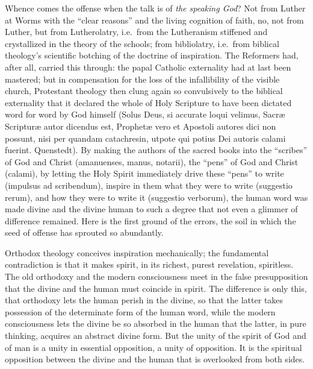 \documentclass[12pt]{book}
\newcommand{\opage}[1]{\marginnote{\footnotesize\textit{[#1]}}}
\begin{document}
Whence comes the offense when the talk is of \emph{the speaking God}? Not
from Luther at Worms with the ``clear reasons'' and the living cognition
of faith, no, not from Luther, but from Lutherolatry, i.e.\ from the
Lutheranism stiffened and crystallized in the theory of the schools; from
bibliolatry, i.e.\ from biblical theology's scientific botching of the
doctrine of inspiration. The Reformers had, after all, carried this
through: the papal Catholic externality had at last been mastered; but in
compensation for the loss of the infallibility of the visible church,
Protestant theology then clung again so convulsively to the biblical
externality that it declared the whole of Holy Scripture to have been
dictated word for word by God himself (Solus Deus, si accurate loqui
velimus, Sacræ Scripturæ autor dicendus est, Prophetæ vero et Apostoli
autores dici non possunt, nisi per quandam catachresin, utpote qui potius
Dei autoris calami fuerint. Quenstedt). By making the authors of the
sacred books into the ``scribes'' of God and Christ (amanuenses, manus,
notarii), the ``pens'' of God and Christ (calami), by letting the Holy
Spirit immediately drive these ``pens'' to write (impulsus ad scribendum),
inspire in them what they were to write (suggestio rerum), and how they
were to write it (suggestio verborum), the human word was made divine and
the divine human to such a degree that not even a glimmer of
\opage{184}\setcounter{footnote}{0}%
difference remained. Here is the first ground of the errors, the soil in
which the seed of offense has sprouted so abundantly.

Orthodox theology conceives inspiration mechanically; the fundamental
contradiction is that it makes spirit, in its richest, purest revelation,
spiritless. The old orthodoxy and the modern consciousness meet in the
false presupposition that the divine and the human must coincide in
spirit. The difference is only this, that orthodoxy lets the human perish
in the divine, so that the latter takes possession of the determinate form
of the human word, while the modern consciousness lets the divine be so
absorbed in the human that the latter, in pure thinking, acquires an
abstract divine form. But the unity of the spirit of God and of man is a
unity in essential opposition, a unity of opposition. It is the spiritual
opposition between the divine and the human that is overlooked from both
sides.
\end{document}
